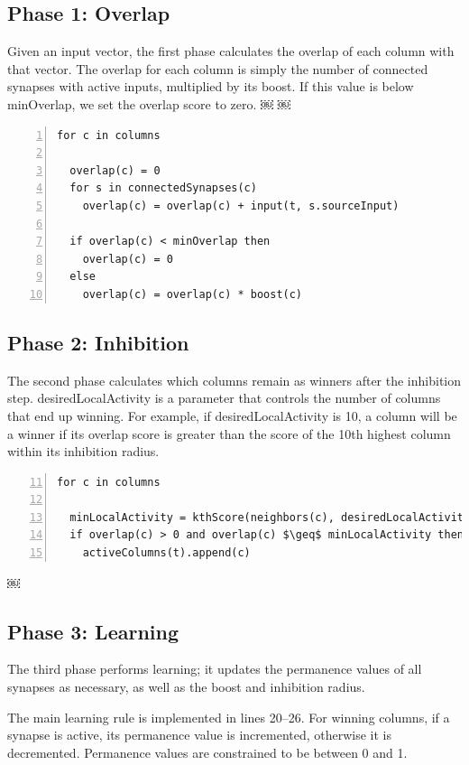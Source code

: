 \documentclass{report}
\begin{document}
\subsection*{Phase 1: Overlap}

Given an input vector, the first phase calculates the overlap of each
column with that vector. The overlap for each column is simply the
number of connected synapses with active inputs, multiplied by its
boost. If this value is below minOverlap, we set the overlap score to
zero.  ￼ ￼

\begin{lstlisting}[numbers=left]
for c in columns

  overlap(c) = 0
  for s in connectedSynapses(c)
    overlap(c) = overlap(c) + input(t, s.sourceInput)

  if overlap(c) < minOverlap then
    overlap(c) = 0
  else
    overlap(c) = overlap(c) * boost(c)
\end{lstlisting}

\subsection*{Phase 2: Inhibition}
The second phase calculates which columns remain as winners after the
inhibition step. desiredLocalActivity is a parameter that controls the
number of columns that end up winning. For example, if
desiredLocalActivity is 10, a column will be a winner if its overlap
score is greater than the score of the 10th highest column within its
inhibition radius.

\begin{lstlisting}[numbers=left,firstnumber=11,mathescape]
for c in columns

  minLocalActivity = kthScore(neighbors(c), desiredLocalActivity)
  if overlap(c) > 0 and overlap(c) $\geq$ minLocalActivity then
    activeColumns(t).append(c)

\end{lstlisting}￼

\subsection*{Phase 3: Learning}
The third phase performs learning; it updates the permanence values of
all synapses as necessary, as well as the boost and inhibition radius.

The main learning rule is implemented in lines 20--26. For winning
columns, if a synapse is active, its permanence value is incremented,
otherwise it is decremented. Permanence values are constrained to be
between 0 and 1.
\end{document}
